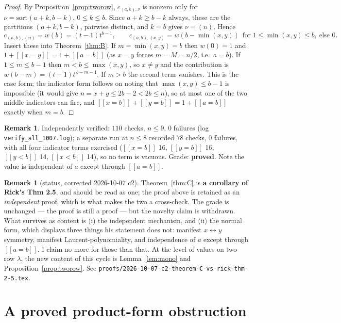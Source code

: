 \documentclass[11pt]{article}
\theoremstyle{plain}
\theoremstyle{definition}
\newtheorem{remark}[theorem]{Remark}
\newcommand{\lam}{\lambda}
\newcommand{\lb}{[\![}
\newcommand{\rb}{]\!]}
\begin{document}
\begin{proof}
By Proposition~\ref{prop:tworow}, $c_{(a,b),\nu}$ is nonzero only for
$\nu=\mathrm{sort}(a+k,b-k)$, $0\le k\le b$. Since $a+k\ge b-k$ always, these are the partitions
$(a+k,b-k)$, pairwise distinct, and $k=b$ gives $\nu=(n)$. Hence
\[
  c_{(a,b),(n)}=w(b)=(t-1)t^{b-1},\qquad
  c_{(a,b),(x,y)}=w(b-\min(x,y))\ \ \text{for } 1\le\min(x,y)\le b,\ \text{else }0 .
\]
Insert these into Theorem~\ref{thm:B}. If $m=\min(x,y)=b$ then $w(0)=1$ and
$1+\lb x=y\rb=1+\lb a=b\rb$ (as $x=y$ forces $m=M=n/2$, i.e.\ $a=b$). If $1\le m\le b-1$ then
$m<b\le\max(x,y)$, so $x\ne y$ and the contribution is $w(b-m)=(t-1)t^{\,b-m-1}$. If $m>b$ the
second term vanishes. This is the case form; the indicator form follows on noting that
$\max(x,y)\le b-1$ is impossible (it would give $n=x+y\le 2b-2<2b\le n$), so at most one of the
two middle indicators can fire, and $\lb x=b\rb+\lb y=b\rb=1+\lb a=b\rb$ exactly when $m=b$.
\end{proof}

\begin{remark}
Independently verified: $110$ checks, $n\le 9$, $0$ failures (log \texttt{verify\_all\_1007.log});
a separate run at $n\le 8$ recorded $78$ checks, $0$ failures, with all four indicator terms
exercised ($\lb x=b\rb$ 16, $\lb y=b\rb$ 16, $\lb y<b\rb$ 14, $\lb x<b\rb$ 14), so no term is
vacuous. Grade: \textbf{proved}. Note the value is independent of $a$ except through
$\lb a=b\rb$.
\end{remark}

\begin{remark}[status, corrected 2026-10-07 c2]
Theorem~\ref{thm:C} is \textbf{a corollary of Rick's Thm 2.5}, and should be read as one; the
proof above is retained as an \emph{independent} proof, which is what makes the two a cross-check.
The grade is unchanged --- the proof is still a proof --- but the novelty claim is withdrawn. What
survives as content is (i) the independent mechanism, and (ii) the normal form, which displays
three things his statement does not: manifest $x\leftrightarrow y$ symmetry, manifest
Laurent-polynomiality, and independence of $a$ except through $\lb a=b\rb$. I claim no more for
those than that. At the level of values on two-row $\lam$, the new content of this cycle is
Lemma~\ref{lem:mono} and Proposition~\ref{prop:tworow}. See
\texttt{proofs/2026-10-07-c2-theorem-C-vs-rick-thm-2-5.tex}.
\end{remark}

\section{A proved product-form obstruction}
\end{document}
